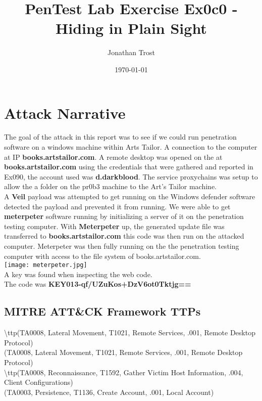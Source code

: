 \documentclass[notitlepage]{article}
\begin{document}
	
	
	\title{PenTest Lab Exercise Ex0c0 - Hiding in Plain Sight}
	\author{Jonathan Trost}
	\date{\isodate\today}
	
	\maketitle
	
	\tableofcontents
	
	\newpage 
	
	\section{Attack Narrative}
	\indent The goal of the attack in this report was to see if we could run penetration software on a windows machine within Arts Tailor. A connection to the computer at IP \textbf{books.artstailor.com}.  A remote desktop was opened on the at \textbf{books.artstailor.com} using the credentials that were gathered and reported in Ex090, the account used was \textbf{d.darkblood}. The service proxychains was setup to allow the a folder on the pr0b3 machine to the Art's Tailor machine.  \\
	\indent A \textbf{Veil} payload was attempted to get running on the Windows defender software detected the payload and prevented it from running. We were able to get \textbf{meterpeter} software running by initializing a server of it on the penetration testing computer. With \textbf{Meterpeter} up, the generated update file was transferred to \textbf{books.artstailor.com} this code was then run on the attacked computer.  Meterpeter was then fully running on the the penetration testing computer with access to the file system of books.artstailor.com. \\ 
	\texttt{[image: meterpeter.jpg]} \\
	
	 A key was found when inspecting the web code. \\
	
	\indent The code was \textbf{KEY013-qf/UZuKos+DzV6ot0Tktjg==} \\
	
	\subsection{MITRE ATT{\&}CK Framework TTPs}
	
	\indent\textbackslash ttp(TA0008, Lateral Movement, T1021, Remote Services, .001, Remote Desktop Protocol) \\
	\ttp(TA0008, Lateral Movement, T1021, Remote Services, .001, Remote Desktop Protocol) \\
	
	\indent\textbackslash ttp(TA0008, Reconnaissance, T1592, Gather Victim Host Information, .004, Client Configurations) \\
	\ttp(TA0003, Persistence, T1136, Create Account, .001, Local Account) \\
\end{document}
